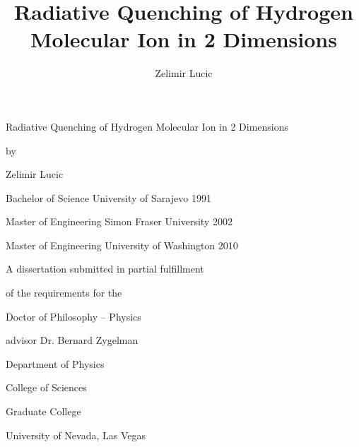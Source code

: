 
\begin{titlepage}
   \begin{center}
       \vspace*{1cm}

Radiative Quenching of Hydrogen Molecular Ion in 2 Dimensions
\title{Radiative Quenching of Hydrogen Molecular Ion  in 2 Dimensions}
\vspace{1.5cm}

by 

Zelimir Lucic
\author{Zelimir Lucic}
\vspace{1.5cm}

Bachelor of Science
University of Sarajevo
1991

Master of Engineering
Simon Fraser University
2002

Master of Engineering
University of Washington
2010

\vfill

A dissertation submitted in partial fulfillment

of the requirements for the

Doctor of Philosophy – Physics
\vspace{1cm}

advisor
Dr. Bernard Zygelman

\vspace{1cm}
Department of Physics

College of Sciences

Graduate College

University of Nevada, Las Vegas

\end{center}
\end{titlepage}

